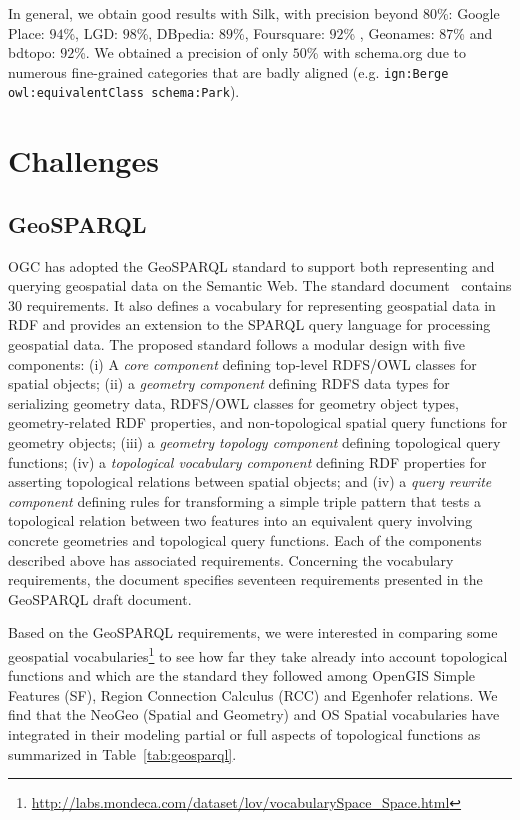\documentclass[a4paper,11pt]{report}
\begin{document}
In general, we obtain good results with Silk, with precision beyond $80$\%: Google Place: $94$\%, LGD: $98$\%, DBpedia: $89$\%, Foursquare: $92$\% , Geonames: $87$\% and bdtopo: $92$\%. We obtained a precision of only $50$\% with schema.org due to numerous fine-grained categories that are badly aligned (e.g. \texttt{ign:Berge owl:equivalentClass schema:Park}).


\section{Challenges}                                                        \label{sec:challenges}

\subsection{GeoSPARQL}
OGC has adopted the GeoSPARQL standard to support both representing and querying geospatial data on the Semantic Web. The standard document~\cite{ogc2012} contains 30 requirements. It also defines a vocabulary for representing geospatial data in RDF and provides an extension to the SPARQL query language for processing geospatial data. The proposed standard follows a modular design with five components: (i) A \textit{core component} defining top-level RDFS/OWL classes for spatial objects; (ii) a \textit{geometry component} defining RDFS data types for serializing geometry data, RDFS/OWL classes for geometry object types, geometry-related RDF properties, and non-topological spatial query functions for geometry objects; (iii) a \textit{geometry topology component} defining topological query functions; (iv) a \textit{topological vocabulary component} defining RDF properties for asserting topological relations between spatial objects; and (iv) a \textit{query rewrite component} defining rules for transforming a simple triple pattern that tests a topological relation between two features into an equivalent query involving concrete geometries and topological query functions. Each of the components described above has associated requirements. Concerning the vocabulary requirements, the document specifies seventeen requirements presented in the GeoSPARQL draft document.


Based on the GeoSPARQL requirements, we were interested in comparing some geospatial vocabularies\footnote{\url{http://labs.mondeca.com/dataset/lov/vocabularySpace_Space.html}} to see how far they take already into account topological functions and which are the standard they followed among OpenGIS Simple Features (SF), Region Connection Calculus (RCC) and Egenhofer relations. We find that the NeoGeo (Spatial and Geometry) and OS Spatial vocabularies have integrated in their modeling partial or full aspects of topological functions as summarized in Table~\ref{tab:geosparql}.
\end{document}
